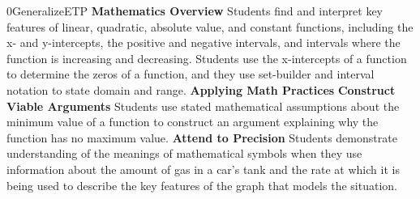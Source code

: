 \documentclass{article}
\newenvironment{te-addendum}[2]{}{}     %
\newcommand{\te}[1]{}                   %
\begin{document}
\begin{te-addendum}{0}{GeneralizeETP}
\textbf{Mathematics Overview}
Students find and interpret key features of linear, quadratic, absolute value, and constant functions, including the x- and y-intercepts, the positive and negative intervals, and intervals where the function is increasing and decreasing.
Students use the x-intercepts of a function to determine the zeros of a function, and they use set-builder and interval notation to state domain and range.
\textbf{Applying Math Practices}
\textbf{Construct Viable Arguments}
Students use stated mathematical assumptions about the minimum value of a function to construct an argument explaining why the function has no maximum value.
\textbf{Attend to Precision}
Students demonstrate understanding of the meanings of mathematical symbols when they use information about the amount of gas in a car’s tank and the rate at which it is being used to describe the key features of the graph that models the situation.
\te{SavvasRealize.com: Program Resources.}
\end{te-addendum}
\end{document}
